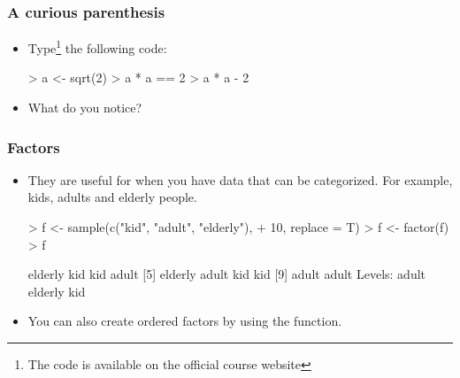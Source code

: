 \begin{frame}
  \frametitle{A curious parenthesis}
  \begin{itemize}
  \item Type\footnote{The  code is available on the official course website} the following code:
\begin{Schunk}
\begin{Sinput}
> a <- sqrt(2)
> a * a == 2
> a * a - 2
\end{Sinput}
\end{Schunk}
  \item What do you notice?
  \end{itemize}
\end{frame}

\begin{frame}
  \frametitle{Factors}
  \begin{itemize}
  \item They are useful for when you have data that can be categorized. For example, kids, adults and elderly people.
\begin{Schunk}
\begin{Sinput}
> f <- sample(c("kid", "adult", "elderly"), 
+     10, replace = T)
> f <- factor(f)
> f
\end{Sinput}
\begin{Soutput}
 [1] elderly kid     kid     adult  
 [5] elderly adult   kid     kid    
 [9] adult   adult  
Levels: adult elderly kid
\end{Soutput}
\end{Schunk}
  \item You can also create ordered factors by using the  function.
  \end{itemize}
\end{frame}

